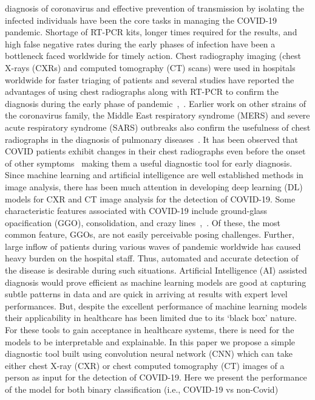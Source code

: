\documentclass[10pt,journal,compsoc]{IEEEtran}
\begin{document}
% 
% 
% 
% 
 diagnosis of coronavirus and effective prevention of transmission by isolating the infected individuals have been the core tasks in managing the COVID-19 pandemic. Shortage of RT-PCR kits, longer times required for the results, and high false negative rates during the early phases of infection have been a bottleneck faced worldwide for timely action. Chest radiography imaging (chest X-rays (CXRs) and computed tomography (CT) scans) were used in hospitals worldwide for faster triaging of patients and several studies have reported the advantages of using chest radiographs along with RT-PCR to confirm the diagnosis during the early phase of pandemic~\cite{xie2020chest},~\cite{cleverley2020role}. Earlier work on other strains of the coronavirus family, the Middle East respiratory syndrome (MERS) and severe acute respiratory syndrome (SARS) outbreaks also confirm the usefulness of chest radiographs in the diagnosis of pulmonary diseases~\cite{hosseiny2020radiology}. It has been observed that COVID patients exhibit changes in their chest radiographs even before the onset of other symptoms~\cite{shi2020radiological} making them a useful diagnostic tool for early diagnosis. Since machine learning and artificial intelligence are well established methods in image analysis, there has been much attention in developing deep learning (DL) models for CXR and CT image analysis for the detection of COVID-19. Some characteristic features associated with COVID-19 include ground-glass opacification (GGO), consolidation, and crazy lines~\cite{lee2020covid},~\cite{litmanovich2020review}. Of these, the most common feature, GGOs, are not easily perceivable posing challenges. Further, large inflow of patients during various waves of pandemic worldwide has caused heavy burden on the hospital staff.  Thus, automated and accurate detection of the disease is desirable during such situations. Artificial Intelligence (AI) assisted diagnosis would prove efficient as machine learning models are good at capturing subtle patterns in data and are quick in arriving at results with expert level performances. But, despite the excellent performance of machine learning models their applicability in healthcare has been limited due to its ‘black box’ nature. For these tools to gain acceptance in healthcare systems, there is need for the models to be interpretable and explainable. In this paper we propose a simple diagnostic tool built using convolution neural network (CNN) which can take either chest X-ray (CXR) or chest computed tomography (CT) images of a person as input for the detection of COVID-19. Here we present the performance of the model for both binary classification (i.e., COVID-19 vs non-Covid) 
\end{document}
